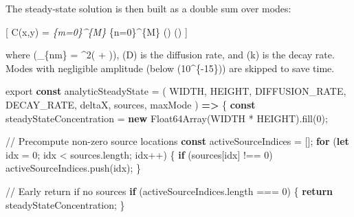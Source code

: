 \documentclass[
  letterpaper,
  DIV=11,
  numbers=noendperiod]{scrreprt}
\newenvironment{Shaded}{\begin{snugshade}}{\end{snugshade}}
\newcommand{\AttributeTok}[1]{\textcolor[rgb]{0.40,0.45,0.13}{#1}}
\newcommand{\BuiltInTok}[1]{\textcolor[rgb]{0.00,0.23,0.31}{#1}}
\newcommand{\CommentTok}[1]{\textcolor[rgb]{0.37,0.37,0.37}{#1}}
\newcommand{\ControlFlowTok}[1]{\textcolor[rgb]{0.00,0.23,0.31}{\textbf{#1}}}
\newcommand{\DecValTok}[1]{\textcolor[rgb]{0.68,0.00,0.00}{#1}}
\newcommand{\FunctionTok}[1]{\textcolor[rgb]{0.28,0.35,0.67}{#1}}
\newcommand{\ImportTok}[1]{\textcolor[rgb]{0.00,0.46,0.62}{#1}}
\newcommand{\KeywordTok}[1]{\textcolor[rgb]{0.00,0.23,0.31}{\textbf{#1}}}
\newcommand{\NormalTok}[1]{\textcolor[rgb]{0.00,0.23,0.31}{#1}}
\newcommand{\OperatorTok}[1]{\textcolor[rgb]{0.37,0.37,0.37}{#1}}
\begin{document}
The steady‑state solution is then built as a double sum over modes:

{[} C(x,y) = \sum\emph{\{m=0\}\^{}\{M\} \sum}\{n=0\}\^{}\{M\}
 \cos\left(\right)
\cos\left(\right) {]}

where (\lambda\_\{nm\} = \pi\^{}2\left( +
\right)), (D) is the diffusion rate, and (k) is the
decay rate. Modes with negligible amplitude (below (10\^{}\{-15\})) are
skipped to save time.

\label{as-main}%
\begin{Shaded}
\begin{Highlighting}[]
\ImportTok{export} \KeywordTok{const}\NormalTok{ analyticSteadyState }\OperatorTok{=}\NormalTok{ (}
\NormalTok{    WIDTH}\OperatorTok{,}
\NormalTok{    HEIGHT}\OperatorTok{,}
\NormalTok{    DIFFUSION\_RATE}\OperatorTok{,}
\NormalTok{    DECAY\_RATE}\OperatorTok{,}
\NormalTok{    deltaX}\OperatorTok{,} 
\NormalTok{    sources}\OperatorTok{,} 
\NormalTok{    maxMode }
\NormalTok{) }\KeywordTok{=\textgreater{}}\NormalTok{ \{}
    \KeywordTok{const}\NormalTok{ steadyStateConcentration }\OperatorTok{=} \KeywordTok{new} \BuiltInTok{Float64Array}\NormalTok{(WIDTH }\OperatorTok{*}\NormalTok{ HEIGHT)}\OperatorTok{.}\FunctionTok{fill}\NormalTok{(}\DecValTok{0}\NormalTok{)}\OperatorTok{;}

    \CommentTok{// Precompute non{-}zero source locations}
    \KeywordTok{const}\NormalTok{ activeSourceIndices }\OperatorTok{=}\NormalTok{ []}\OperatorTok{;}
    \ControlFlowTok{for}\NormalTok{ (}\KeywordTok{let}\NormalTok{ idx }\OperatorTok{=} \DecValTok{0}\OperatorTok{;}\NormalTok{ idx }\OperatorTok{\textless{}}\NormalTok{ sources}\OperatorTok{.}\AttributeTok{length}\OperatorTok{;}\NormalTok{ idx}\OperatorTok{++}\NormalTok{) \{}
        \ControlFlowTok{if}\NormalTok{ (sources[idx] }\OperatorTok{!==} \DecValTok{0}\NormalTok{) activeSourceIndices}\OperatorTok{.}\FunctionTok{push}\NormalTok{(idx)}\OperatorTok{;}
\NormalTok{    \}}

    \CommentTok{// Early return if no sources}
    \ControlFlowTok{if}\NormalTok{ (activeSourceIndices}\OperatorTok{.}\AttributeTok{length} \OperatorTok{===} \DecValTok{0}\NormalTok{) \{}
        \ControlFlowTok{return}\NormalTok{ steadyStateConcentration}\OperatorTok{;}
\NormalTok{    \}}


\end{Highlighting}
\end{Shaded}
\end{document}
